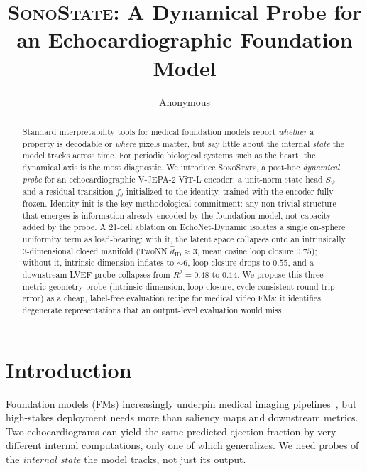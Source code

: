 \documentclass[runningheads]{llncs}
\newcommand{\sonostate}{\textsc{SonoState}\xspace}
\begin{document}
\title{\sonostate: A Dynamical Probe for an Echocardiographic Foundation Model}
\author{Anonymous}

\maketitle

\begin{abstract}
Standard interpretability tools for medical foundation models report
\emph{whether} a property is decodable or \emph{where} pixels matter, but
say little about the internal \emph{state} the model tracks across time.
For periodic biological systems such as the heart, the dynamical axis is
the most diagnostic. We introduce \sonostate, a post-hoc \emph{dynamical
probe} for an echocardiographic V-JEPA-2 ViT-L encoder: a unit-norm
state head $S_\psi$ and a residual transition $f_\theta$ initialized to
the identity, trained with the encoder fully frozen. Identity init is the
key methodological commitment: any non-trivial structure that emerges is
information already encoded by the foundation model, not capacity added by
the probe. A 21-cell ablation on EchoNet-Dynamic isolates a single
on-sphere uniformity term as load-bearing: with it, the latent space
collapses onto an intrinsically $3$-dimensional closed manifold (TwoNN
$\widehat{d}_\mathrm{ID}\!\approx\!3$, mean cosine loop closure $0.75$);
without it, intrinsic dimension inflates to $\sim\!6$, loop closure drops
to $0.55$, and a downstream LVEF probe collapses from $R^2{=}0.48$ to
$0.14$. We propose this three-metric geometry probe (intrinsic dimension,
loop closure, cycle-consistent round-trip error) as a cheap, label-free
evaluation recipe for medical video FMs: it identifies degenerate
representations that an output-level evaluation would miss.

\end{abstract}

\section{Introduction}

Foundation models (FMs) increasingly underpin medical imaging
pipelines~\cite{vjepa2,echonet,echoclip}, but high-stakes deployment needs
more than saliency maps and downstream metrics. Two echocardiograms can
yield the same predicted ejection fraction by very different internal
computations, only one of which generalizes. We need probes of the
\emph{internal state} the model tracks, not just its output.
\end{document}
